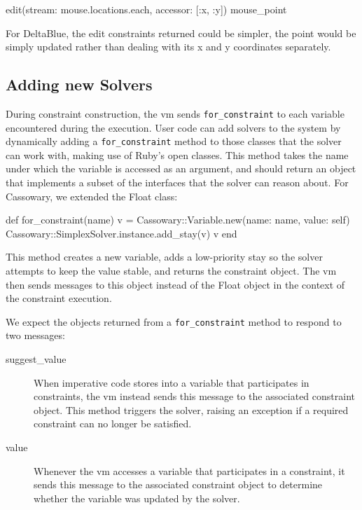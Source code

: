 \begin{code}
edit(stream: mouse.locations.each,
     accessor: [:x, :y]) { mouse_point }
\end{code}

For DeltaBlue, the edit constraints returned could be simpler, \eg the
point would be simply updated rather than dealing with its x and y
coordinates separately.

\subsection{Adding new Solvers}
\label{sec:solver-interface}

During constraint construction, the \ac{vm} sends
\lstinline{for_constraint} to each variable encountered during the
execution. User code can add solvers to the system by dynamically adding a
\lstinline{for_constraint} method to those classes that the solver can
work with, making use of Ruby's open classes. This method takes the
name under which the variable is accessed as an argument, and should
return an object that implements a subset of the interfaces
that the solver can reason about. For Cassowary, we extended the Float
class:
\begin{code}
  def for_constraint(name)
    v = Cassowary::Variable.new(name: name, value: self)
    Cassowary::SimplexSolver.instance.add_stay(v)
    v
  end
\end{code}

This method creates a new variable, adds a low-priority stay so the solver
attempts to keep the value stable, and returns the constraint
object. The \ac{vm} then sends messages to this object instead of the
Float object in the context of the constraint execution.

We expect the objects returned from a \lstinline{for_constraint}
method to respond to two messages:
\begin{description}
\item[suggest\_value] When imperative code stores into a variable that
  participates in constraints, the \ac{vm} instead sends this message
  to the associated constraint object. This method triggers the
  solver, raising an exception if a required constraint can no longer
  be satisfied.
\item[value] Whenever the \ac{vm} accesses a variable that
  participates in a constraint, it sends this message to the
  associated constraint object to determine whether the variable was
  updated by the solver.
\end{description}

